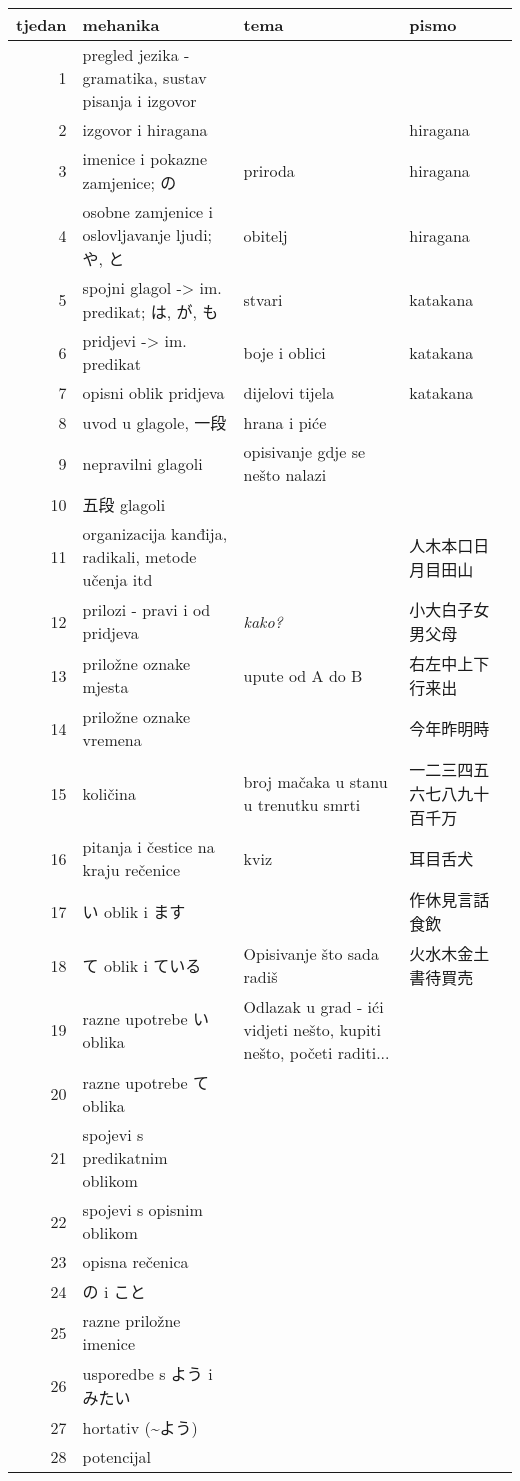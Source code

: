 
\author{Tomislav Mamić}


	
	\noindent
	\begin{tabular}{|r|p{150pt}|p{150pt}|p{120pt}|}
		\hline
		\textbf{tjedan}&\textbf{mehanika}&\textbf{tema}&\textbf{pismo}\\
		\hline
		1&pregled jezika - gramatika, sustav pisanja i izgovor&&\\
		\hline
		2&izgovor i hiragana&&hiragana\\
		\hline
		3&imenice i pokazne zamjenice; の&priroda&hiragana\\
		\hline
		4&osobne zamjenice i oslovljavanje ljudi; や, と&obitelj&hiragana\\
		\hline
		5&spojni glagol -> im. predikat; は, が, も&stvari&katakana\\
		\hline
		6&pridjevi -> im. predikat&boje i oblici&katakana\\
		\hline
		7&opisni oblik pridjeva&dijelovi tijela&katakana\\
		\hline
		8&uvod u glagole, 一段&hrana i piće&\\
		\hline
		9&nepravilni glagoli&opisivanje gdje se nešto nalazi&\\
		\hline
		10&五段 glagoli&&\\
		\hline
		11&organizacija kanđija, radikali, metode učenja itd&&人木本口日月目田山\\
		\hline
		12&prilozi - pravi i od pridjeva&\textit{kako?}&小大白子女男父母\\
		\hline
		13&priložne oznake mjesta&upute od A do B&右左中上下行来出\\
		\hline
		14&priložne oznake vremena&&今年昨明時\\
		\hline
		15&količina&broj mačaka u stanu u trenutku smrti&一二三四五六七八九十百千万\\
		\hline
		16&pitanja i čestice na kraju rečenice&kviz&耳目舌犬\\
		\hline
		17&い oblik i ます&&作休見言話食飲\\
		\hline
		18&て oblik i ている&Opisivanje što sada radiš&火水木金土書待買売\\
		\hline
		19&razne upotrebe い oblika&Odlazak u grad - ići vidjeti nešto, kupiti nešto, početi raditi...&\\
		\hline
		20&razne upotrebe て oblika&&\\
		\hline
		21&spojevi s predikatnim oblikom&&\\
		\hline
		22&spojevi s opisnim oblikom&&\\
		\hline
		23&opisna rečenica&&\\
		\hline
		24&の i こと&&\\
		\hline
		25&razne priložne imenice&&\\
		\hline
		26&usporedbe s よう i みたい&&\\
		\hline
		27&hortativ (\textasciitilde よう)&&\\
		\hline
		28&potencijal&&\\
		\hline
	\end{tabular}
